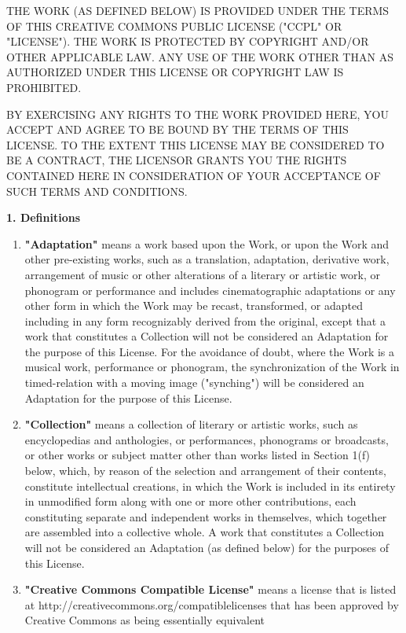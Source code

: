 
THE WORK (AS DEFINED BELOW) IS PROVIDED UNDER THE TERMS OF THIS
CREATIVE COMMONS PUBLIC LICENSE ("CCPL" OR "LICENSE"). THE WORK IS
PROTECTED BY COPYRIGHT AND/OR OTHER APPLICABLE LAW. ANY USE OF THE
WORK OTHER THAN AS AUTHORIZED UNDER THIS LICENSE OR COPYRIGHT LAW
IS PROHIBITED.

BY EXERCISING ANY RIGHTS TO THE WORK PROVIDED HERE, YOU ACCEPT AND
AGREE TO BE BOUND BY THE TERMS OF THIS LICENSE. TO THE EXTENT THIS
LICENSE MAY BE CONSIDERED TO BE A CONTRACT, THE LICENSOR GRANTS YOU
THE RIGHTS CONTAINED HERE IN CONSIDERATION OF YOUR ACCEPTANCE OF
SUCH TERMS AND CONDITIONS.

\textbf{1. Definitions}

\begin{enumerate}
\item
  \textbf{"Adaptation"} means a work based upon the Work, or upon the
  Work and other pre-existing works, such as a translation,
  adaptation, derivative work, arrangement of music or other
  alterations of a literary or artistic work, or phonogram or
  performance and includes cinematographic adaptations or any other
  form in which the Work may be recast, transformed, or adapted
  including in any form recognizably derived from the original,
  except that a work that constitutes a Collection will not be
  considered an Adaptation for the purpose of this License. For the
  avoidance of doubt, where the Work is a musical work, performance
  or phonogram, the synchronization of the Work in timed-relation
  with a moving image ("synching") will be considered an Adaptation
  for the purpose of this License.
\item
  \textbf{"Collection"} means a collection of literary or artistic
  works, such as encyclopedias and anthologies, or performances,
  phonograms or broadcasts, or other works or subject matter other
  than works listed in Section 1(f) below, which, by reason of the
  selection and arrangement of their contents, constitute
  intellectual creations, in which the Work is included in its
  entirety in unmodified form along with one or more other
  contributions, each constituting separate and independent works in
  themselves, which together are assembled into a collective whole. A
  work that constitutes a Collection will not be considered an
  Adaptation (as defined below) for the purposes of this License.
\item
  \textbf{"Creative Commons Compatible License"} means a license that
  is listed at http://creativecommons.org/compatiblelicenses that has
  been approved by Creative Commons as being essentially equivalent

\end{enumerate}
